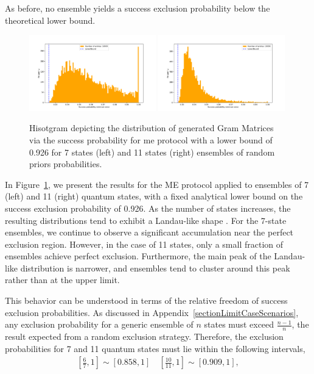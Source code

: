 \documentclass[12pt,letterpaper]{article}
\begin{document}
As before, no ensemble yields a success exclusion probability below the theoretical lower bound.

\begin{figure}[H]
	\centering
	\includegraphics[width=0.49\textwidth, trim={1.5cm 0.3cm 2.4cm 1.5cm}, clip]{../Plots/ExclusionMinimumErrorRandomDistributionZ7Prob0.924.pdf}
	\includegraphics[width=0.49\textwidth, trim={1.5cm 0.3cm 2.4cm 1.5cm}, clip]{../Plots/ExclusionMinimumErrorRandomDistributionZ11Prob0.926.pdf}
	\caption{Hisotgram depicting the distribution of generated Gram Matrices via the success probability for \gls{me} protocol with a lower bound of 0.926 for 7 states (left) and 11 states (right) ensembles of random priors probabilities.}
	\label{FigureDistZ7Z11}
\end{figure}

In Figure~\ref{FigureDistZ7Z11}, we present the results for the ME protocol applied to ensembles of 7 (left) and 11 (right) quantum states, with a fixed analytical lower bound on the success exclusion probability of 0.926. As the number of states increases, the resulting distributions tend to exhibit a Landau-like shape \cite{landau}. For the 7-state ensembles, we continue to observe a significant accumulation near the perfect exclusion region. However, in the case of 11 states, only a small fraction of ensembles achieve perfect exclusion. Furthermore, the main peak of the Landau-like distribution is narrower, and ensembles tend to cluster around this peak rather than at the upper limit.

This behavior can be understood in terms of the relative freedom of success exclusion probabilities. As discussed in Appendix~\ref{sectionLimitCaseScenarios}, any exclusion probability for a generic ensemble of $n$ states must exceed $\frac{n-1}{n}$, the result expected from a random exclusion strategy. Therefore, the exclusion probabilities for 7 and 11 quantum states must lie within the following intervals,
\begin{align*}
\left[\frac{6}{7},1\right]\sim\left[0.858,1\right]\quad \left[\frac{10}{11},1\right]\sim\left[0.909,1\right],
\end{align*}
\end{document}
